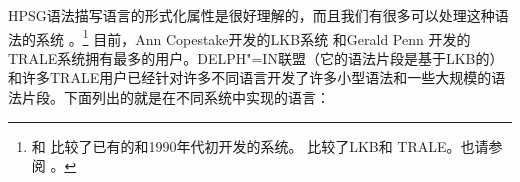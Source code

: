 HPSG语法描写语言的形式化属性是很好理解的，而且我们有很多可以处理这种语法的系统
\citep*{DS91a,%
DD93a-u,%
PV91a-u,%
DISCO94,%
%
Erbach95a,%
Schuetz96,STRD96a-u,%
SRTD96a,%
UBCCDDEEMMO-96a,Babel,Mueller2004b,%
CP96,PC99,%
GMG97a-u,%
Copestake2002a,%
Callmeier00a-u,%
Dahlloef2003a-u,%
MPR2002a-u,Penn2004a-u,%
Mueller2007b,%
Sato2008a-u,%
Kaufmann2009a-u,%
Slayden2012a-u,%
Packard2015a-u%
}。\footnote{%
 \citet{UBCCDDEEMMO-96a}和 \citet{Bolc:Czuba:ea:96a-u}比较了已有的和1990年代初开发的系统。 \citet{MelnikHandWritten}比较了LKB和 TRALE。也请参阅 。
}
目前，Ann Copestake开发的LKB系统 和Gerald Penn \citep*{MPR2002a-u,Penn2004a-u}开发的TRALE系统拥有最多的用户。DELPH"=IN联盟（它的语法片段是基于LKB的）和许多TRALE用户已经针对许多不同语言开发了许多小型语法和一些大规模的语法片段。下面列出的就是在不同系统中实现的语言：
